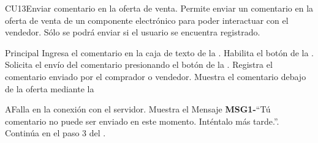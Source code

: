 
% 



	\begin{UseCase}{CU13}{Enviar comentario en la oferta de venta.}{
		Permite enviar un comentario en la oferta de venta de un componente electrónico para poder interactuar con el vendedor. Sólo se podrá enviar si el usuario se encuentra registrado.
	}
		
	\end{UseCase}

	\begin{UCtrayectoria}{Principal}
		\UCpaso[\UCactor] Ingresa el comentario en la caja de texto de la .
		\UCpaso Habilita el botón  de la .
		\UCpaso[\UCactor] Solicita el envío del comentario presionando el botón  de la  .
		\UCpaso Registra el comentario enviado por el comprador o vendedor.
		\UCpaso Muestra el comentario debajo de la oferta mediante la 
\end{UCtrayectoria}
		\begin{UCtrayectoriaA}{A}{Falla en la conexión con el servidor.}
			\UCpaso Muestra el Mensaje {\bf MSG1-}``Tú comentario no puede ser enviado en este momento. Inténtalo más tarde.''.
			\UCpaso Continúa en el paso 3 del .
		\end{UCtrayectoriaA}
		
